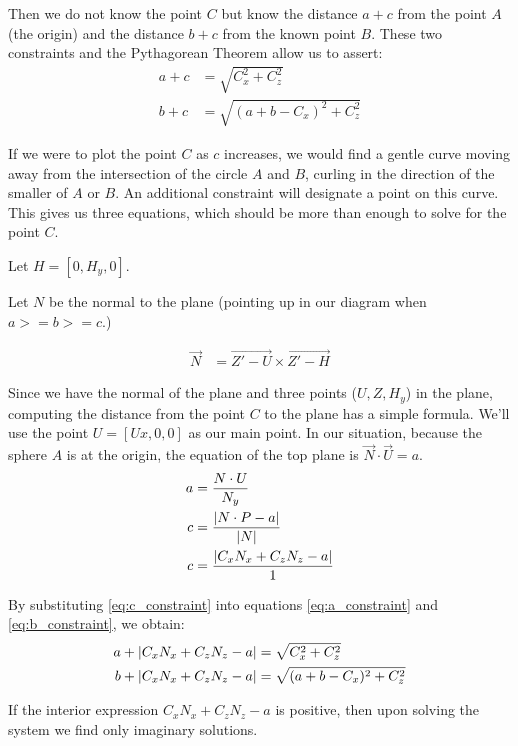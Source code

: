 \documentclass{article}
\begin{document}
Then we do not know the point $C$ but know the distance $a+c$ from
the point $A$ (the origin) and the distance $b+c$ from the known
point $B$. These two constraints and the Pythagorean Theorem allow us to assert:
\begin{align}
a + c &= \sqrt{C_x^2 + C_z ^2} \label{eq:a_constraint}\\
b + c &= \sqrt{(a+b-C_x)^2 + C_z^2} \label{eq:b_constraint}
\end{align}

If we were to plot the point $C$ as $c$ increases, we
would find a gentle curve moving away from the intersection
of the circle $A$ and $B$, curling in the direction of the smaller of $A$ or $B$.
An additional constraint will
designate a point on this curve.
This gives us three equations, which
should be more than enough to solve for the point $C$.

Let $H = [0, H_y,0]$.

Let $N$ be the normal to the plane (pointing up in our diagram
when $ a >= b >= c $.)

\begin{align}
\overrightarrow{N} &= \overrightarrow{Z' - U}  \times \overrightarrow{Z' - H}
\end{align}

Since we have the normal of the plane and three points ($U,Z,H_y$) in the plane,
computing the distance from the point $C$ to the plane has a simple
formula.
We'll use the point $U = [Ux, 0, 0]$ as our main point.
In our situation, because the sphere $A$ is at the origin,
the equation of the top plane  is
$ \overrightarrow{N} \cdot \overrightarrow{U} = a$.
\begin{align}
a &= \frac{N \cdot U}{N_y} \\
c &= \frac{\left\lvert N \cdot P - a\right\rvert}{\left\lvert N\right\rvert} \\
c &= \frac{\left\lvert C_x  N_x  + C_z  N_z - a\right\rvert}{1} \label{eq:c_constraint}
\end{align}

By substituting \ref{eq:c_constraint} into equations
\ref{eq:a_constraint} and \ref{eq:b_constraint},
we obtain:
\begin{align}
  a + \left\lvert C_x N_x + C_z N_z - a\right\rvert &= \sqrt{C_x^2 + C_z^2} \\
  b + \left\lvert C_x N_x + C_z N_z - a\right\rvert &= \sqrt{(a+b-C_x)^2 + C_z^2}
\end{align}

If the interior expression $C_x N_x + C_z N_z - a$ is positive,
then upon solving the system we find only imaginary solutions.
\end{document}

